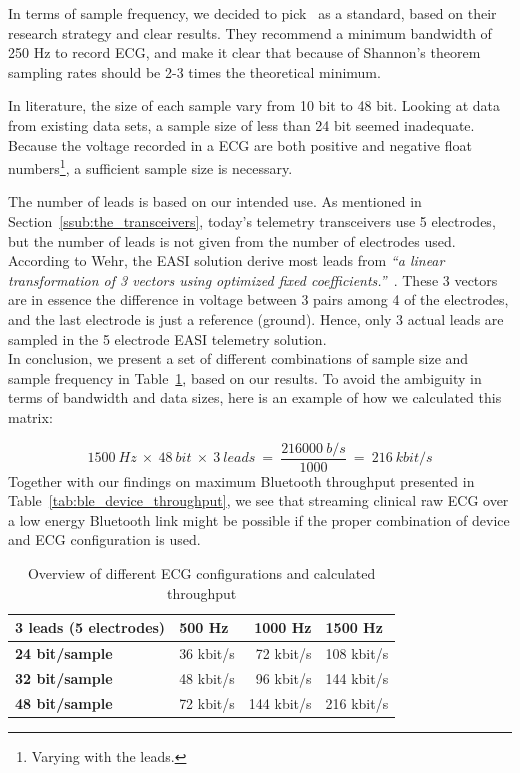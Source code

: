 In terms of sample frequency, we decided to pick~\cite{Rijnbeek:2001vu} as a standard, based on their research strategy and clear results. They recommend a minimum bandwidth of 250 Hz to record ECG, and make it clear that because of Shannon’s theorem sampling rates should be 2-3 times the theoretical minimum.

In literature, the size of each sample vary from 10 bit to 48 bit. Looking at data from existing data sets, a sample size of less than 24 bit seemed inadequate. Because the voltage recorded in a ECG are both positive and negative float numbers\footnote{ Varying with the leads.}, a sufficient sample size is necessary. 

The number of leads is based on our intended use. As mentioned in Section~\ref{ssub:the_transceivers}, today's telemetry transceivers use 5 electrodes, but the number of leads is not given from the number of electrodes used. According to Wehr, the EASI solution derive most leads from \textit{``a linear transformation of 3 vectors using optimized fixed coefficients.''}~\cite{Wehr:2006ht}. These 3 vectors are in essence the difference in voltage between 3 pairs among 4 of the electrodes, and the last electrode is just a reference (ground). Hence, only 3 actual leads are sampled in the 5 electrode EASI telemetry solution.
\\
\newline
\noindent
In conclusion, we present a set of different combinations of sample size and sample frequency in Table~\ref{tab:ecg_sampling_rate}, based on our results. To avoid the ambiguity in terms of bandwidth and data sizes, here is an example of how we calculated this matrix:

\[
  1500\:Hz\:\times\:48\:bit\:\times\:3\:leads\:=\:\frac{216000\:b/s}{1000}\:=\:216\:kbit/s
\]
\noindent
Together with our findings on maximum Bluetooth throughput presented in Table~\ref{tab:ble_device_throughput}, we see that streaming clinical raw ECG over a low energy Bluetooth link might be possible if the proper combination of device and ECG configuration is used.

\begin{table}[]
\centering
\caption{Overview of different ECG configurations and calculated throughput}
\label{tab:ecg_sampling_rate}
\begin{tabular}{@{}l|lrl@{}}
\toprule
\textbf{3 leads (5 electrodes)} & \textbf{500 Hz} & \textbf{1000 Hz} & \textbf{1500 Hz} \\ \midrule
\textbf{24  bit/sample}         & 36 kbit/s & 72 kbit/s & 108 kbit/s         \\
\textbf{32  bit/sample}         & 48 kbit/s & 96 kbit/s & 144 kbit/s         \\
\textbf{48  bit/sample}         & 72 kbit/s & 144 kbit/s  & 216 kbit/s         \\ \bottomrule
\end{tabular}
\end{table}



